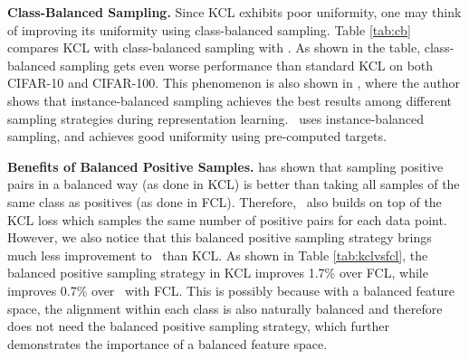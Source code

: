 \textbf{Class-Balanced Sampling.} Since KCL exhibits poor uniformity, one may think of improving its uniformity using class-balanced sampling. Table \ref{tab:cb} compares KCL with class-balanced sampling with \name. As shown in the table, class-balanced sampling gets even worse performance than standard KCL on both CIFAR-10 and CIFAR-100. This phenomenon is also shown in \cite{kang2019decoupling}, where the author shows that instance-balanced sampling achieves the best results among different sampling strategies during representation learning. \name\ uses instance-balanced sampling, and achieves good uniformity using pre-computed targets.

\begin{table}[h]
\caption{Balanced positive sampling strategy improves less on TSC than on FCL on ImageNet-LT.}
\vspace{-5mm}
\label{tab:kclvsfcl}
\begin{center}
\end{center}
\vspace{-15pt}
\end{table}

\textbf{Benefits of Balanced Positive Samples.} \cite{kang2020exploring} has shown that sampling positive pairs in a balanced way (as done in KCL) is better than taking all samples of the same class as positives (as done in FCL). Therefore, \name~also builds on top of the KCL loss which samples the same number of positive pairs for each data point. However, we also notice that this balanced positive sampling strategy brings much less improvement to \name~than KCL. As shown in Table \ref{tab:kclvsfcl}, the balanced positive sampling strategy in KCL improves 1.7\% over FCL, while improves 0.7\% over \name~with FCL. This is possibly because with a balanced feature space, the alignment within each class is also naturally balanced and therefore does not need the balanced positive sampling strategy, which further demonstrates the importance of a balanced feature space.


